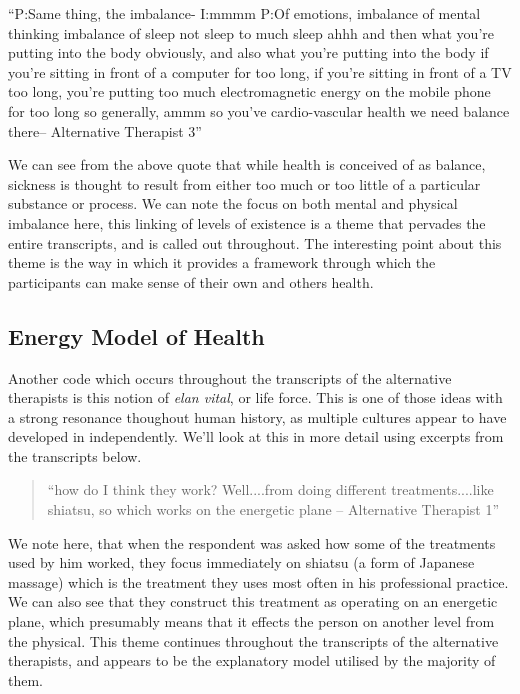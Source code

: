 ``P:Same thing, the imbalance-
I:mmmm
P:Of emotions, imbalance of mental thinking imbalance of sleep not sleep to much sleep ahhh and then what you're putting into the body obviously, and also what you're putting into the body if you're sitting in front of a computer for too long, if you're sitting in front of a TV too long, you're putting too much electromagnetic energy on the mobile phone for too long so generally, ammm so you've cardio-vascular health we need balance there-- Alternative Therapist 3''

We can see from the above quote that while health is conceived of as balance, sickness is thought to result from either too much or too little of a particular substance or process. We can note the focus on both mental and physical imbalance here, this linking of levels of existence is a theme that pervades the entire transcripts, and is called out throughout. The interesting point about this theme is the way in which it provides a framework through which the participants can make sense of their own and others health. 

\subsection{Energy Model of Health}

Another code which occurs throughout the transcripts of the alternative therapists is this notion of \textit{elan vital}, or life force. This is one of those ideas with a strong resonance thoughout human history, as multiple cultures appear to have developed in independently. We'll look at this in more detail using excerpts from the transcripts below. 

\begin{quotation}
``how do I think they work? Well....from doing different treatments....like shiatsu, so which works on the energetic plane – Alternative Therapist 1''  
\end{quotation}


We note here, that when the respondent was asked how some of the treatments used by him worked, they focus immediately on shiatsu (a form of Japanese massage) which is the treatment they uses most often in his professional practice. We can also see that they construct this treatment as operating on an energetic plane, which presumably means that it effects the person on another level from the physical. This theme continues throughout the transcripts of the alternative therapists, and appears to be the explanatory model utilised by the majority of them. 

